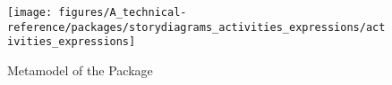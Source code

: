 %
%

\begin{figure}[htb]
  \centering
  \texttt{[image: figures/A\_technical-reference/packages/storydiagrams\_activities\_expressions/activities\_expressions]}
  \caption{Metamodel of the  Package}
  \label{fig:MM:activities:expressions}
\end{figure}